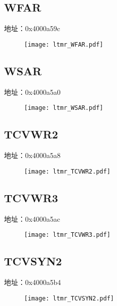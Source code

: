 \subsection{WFAR}
\label{ltmr-WFAR}
地址：0x4000a59c
 \begin{figure}[H]
\texttt{[image: ltmr\_WFAR.pdf]}
\end{figure}

\subsection{WSAR}
\label{ltmr-WSAR}
地址：0x4000a5a0
 \begin{figure}[H]
\texttt{[image: ltmr\_WSAR.pdf]}
\end{figure}

\subsection{TCVWR2}
\label{ltmr-TCVWR2}
地址：0x4000a5a8
 \begin{figure}[H]
\texttt{[image: ltmr\_TCVWR2.pdf]}
\end{figure}

\subsection{TCVWR3}
\label{ltmr-TCVWR3}
地址：0x4000a5ac
 \begin{figure}[H]
\texttt{[image: ltmr\_TCVWR3.pdf]}
\end{figure}

\subsection{TCVSYN2}
\label{ltmr-TCVSYN2}
地址：0x4000a5b4
 \begin{figure}[H]
\texttt{[image: ltmr\_TCVSYN2.pdf]}
\end{figure}

